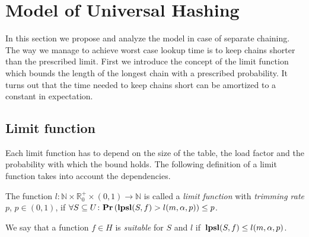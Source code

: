 \section{Model of Universal Hashing}
\label{section-model}
In this section we propose and analyze the model in case of separate chaining. 
The way we manage to achieve worst case lookup time is to keep chains shorter than the prescribed limit. 
First we introduce the concept of the limit function which bounds the length of the longest chain with a prescribed probability. 
It turns out that the time needed to keep chains short can be amortized to a constant in expectation.

\subsection{Limit function}
Each limit function has to depend on the size of the table, the load factor and the probability with which the bound holds. 
The following definition of a limit function takes into account the dependencies.

\begin{definition}
\label{definition-limit-function}
The function $l\colon \mathbb{N} \times \mathbb{R}_0^+ \times (0, 1) \rightarrow \mathbb{N}$ is called a \emph{limit function} with \emph{trimming rate} $p$, $p \in (0, 1)$, if $\forall S \subseteq U\colon \mathbf{Pr}\left(\mathbf{lpsl}(S, f) > l(m, \alpha, p)\right) \leq p$.

We say that a function $f \in H$ is \emph{suitable} for $S$ and $l$ if $\,\mathbf{lpsl}(S, f) \le l(m, \alpha, p)$.
\end{definition}

